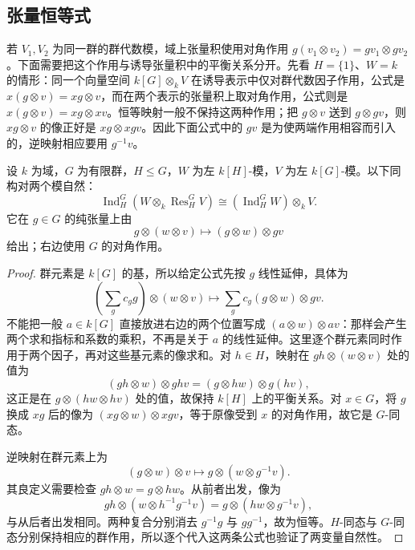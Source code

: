 \subsection{张量恒等式}
\label{b5:subsec:0304:02}

若 \(V_1,V_2\) 为同一群的群代数模，域上张量积使用对角作用 \(g(v_1\otimes v_2)=gv_1\otimes gv_2\)。下面需要把这个作用与诱导张量积中的平衡关系分开。先看 \(H=\{1\}\)、\(W=k\) 的情形：同一个向量空间 \(k[G]\otimes_k V\) 在诱导表示中仅对群代数因子作用，公式是 \(x(g\otimes v)=xg\otimes v\)，而在两个表示的张量积上取对角作用，公式则是 \(x(g\otimes v)=xg\otimes xv\)。恒等映射一般不保持这两种作用；把 \(g\otimes v\) 送到 \(g\otimes gv\)，则 \(xg\otimes v\) 的像正好是 \(xg\otimes xgv\)。因此下面公式中的 \(gv\) 是为使两端作用相容而引入的，逆映射相应要用 \(g^{-1}v\)。

\begin{theorem}[张量恒等式]\label{b5:thm:tensor-identity}
	设 \(k\) 为域，\(G\) 为有限群，\(H\le G\)，\(W\) 为左 \(k[H]\)-模，\(V\) 为左 \(k[G]\)-模。以下同构对两个模自然：
	\begin{equation}\label{b5:eq:tensor-identity}
		\operatorname{Ind}_H^G\left(W\otimes_k\operatorname{Res}_H^G V\right) \cong (\operatorname{Ind}_H^G W)\otimes_k V.
	\end{equation}
	它在 \(g\in G\) 的纯张量上由
	\[
		g\otimes(w\otimes v)\longmapsto(g\otimes w)\otimes gv
	\]
	给出；右边使用 \(G\) 的对角作用。
\end{theorem}
\begin{proof}
	群元素是 \(k[G]\) 的基，所以给定公式先按 \(g\) 线性延伸，具体为
	\[
		\left(\sum_g c_gg\right)\otimes(w\otimes v) \longmapsto\sum_g c_g(g\otimes w)\otimes gv.
	\]
	不能把一般 \(a\in k[G]\) 直接放进右边的两个位置写成 \((a\otimes w)\otimes av\)：那样会产生两个求和指标和系数的乘积，不再是关于 \(a\) 的线性延伸。这里逐个群元素同时作用于两个因子，再对这些基元素的像求和。对 \(h\in H\)，映射在 \(gh\otimes(w\otimes v)\) 处的值为
	\[
		(gh\otimes w)\otimes ghv=(g\otimes hw)\otimes g(hv),
	\]
	这正是在 \(g\otimes(hw\otimes hv)\) 处的值，故保持 \(k[H]\) 上的平衡关系。对 \(x\in G\)，将 \(g\) 换成 \(xg\) 后的像为 \((xg\otimes w)\otimes xgv\)，等于原像受到 \(x\) 的对角作用，故它是 \(G\)-同态。

	逆映射在群元素上为
	\[
		(g\otimes w)\otimes v\longmapsto g\otimes(w\otimes g^{-1}v).
	\]
	其良定义需要检查 \(gh\otimes w=g\otimes hw\)。从前者出发，像为
	\[
		gh\otimes(w\otimes h^{-1}g^{-1}v) =g\otimes(hw\otimes g^{-1}v),
	\]
	与从后者出发相同。两种复合分别消去 \(g^{-1}g\) 与 \(gg^{-1}\)，故为恒等。\(H\)-同态与 \(G\)-同态分别保持相应的群作用，所以逐个代入这两条公式也验证了两变量自然性。
\end{proof}

